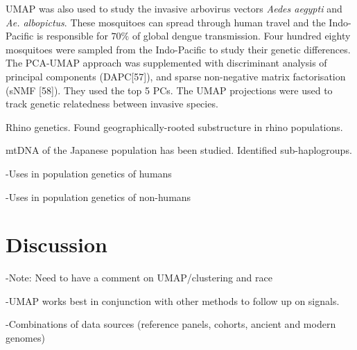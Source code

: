 \documentclass[12pt]{article}
\newcounter{lastnote}
\begin{document}
UMAP was also used to study the invasive arbovirus vectors \textit{Aedes aegypti} and \textit{Ae. albopictus}. These mosquitoes can spread through human travel and the Indo-Pacific is responsible for $70\%$ of global dengue transmission. Four hundred eighty mosquitoes were sampled from the Indo-Pacific to study their genetic differences. The PCA-UMAP approach was supplemented with discriminant analysis of principal components (DAPC[57]), and sparse non-negative matrix factorisation (sNMF [58]). They used the top 5 PCs. The UMAP projections were used to track genetic relatedness between invasive species.\cite{schmidt_population_2020}

Rhino genetics. Found geographically-rooted substructure in rhino populations.\cite{sanchez-barreiro_historical_2020}

mtDNA of the Japanese population has been studied. Identified sub-haplogroups.\cite{yamamoto_genetic_2020}

-Uses in population genetics of humans

-Uses in population genetics of non-humans

\section*{Discussion}

-Note: Need to have a comment on UMAP/clustering and race

-UMAP works best in conjunction with other methods to follow up on signals.

-Combinations of data sources (reference panels, cohorts, ancient and modern genomes)









\end{document}
